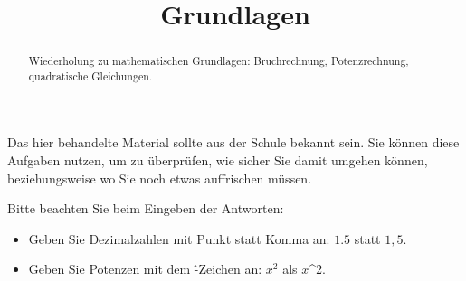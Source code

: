 \documentclass{ximera}
\title{Grundlagen}
\begin{document}
\begin{abstract}
Wiederholung zu mathematischen Grundlagen: Bruchrechnung, Potenzrechnung, quadratische Gleichungen.
\end{abstract}
\maketitle

Das hier behandelte Material sollte aus der Schule bekannt sein. Sie können diese Aufgaben nutzen, um zu überprüfen, wie sicher Sie damit umgehen können, beziehungsweise wo Sie noch etwas auffrischen müssen.

Bitte beachten Sie beim Eingeben der Antworten:
\begin{itemize}
\item
Geben Sie Dezimalzahlen mit Punkt statt Komma an: $1.5$ statt $1,5$.
\item
Geben Sie Potenzen mit dem \^-Zeichen an: $x^2$ als $x$\^{}2.
\end{itemize}
\end{document}
